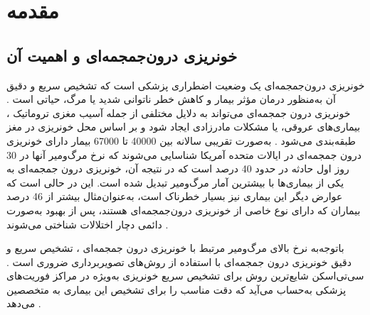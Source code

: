 \setcounter{chapter}{0}	
\chapter{مقدمه}

\section{ خونریزی درون‌جمجمه‌ای و اهمیت آن}

خونریزی‌ درون‌جمجمه‌ای
یک وضعیت اضطراری پزشکی است که تشخیص سریع و دقیق آن به‌منظور درمان مؤثر بیمار و کاهش خطر ناتوانی شدید یا مرگ، حیاتی است \cite{grewal2018radnet}.
خونریزی درون جمجمه‌ای
می‌تواند به دلایل مختلفی از جمله آسیب مغزی تروماتیک
، بیماری‌های عروقی، یا مشکلات مادرزادی ایجاد شود و بر اساس محل خونریزی در مغز طبقه‌بندی می‌شود \cite{monica2022detection}.
 به‌صورت تقریبی سالانه بین 40000 تا 67000 بیمار دارای
خونریزی درون جمجمه‌ای
   در ایالات متحده آمریکا شناسایی می‌شوند که نرخ مرگ‌ومیر آنها در 30 روز اول حادثه در حدود 40 درصد است که در نتیجه آن، 
خونریزی درون جمجمه‌ای
   به یکی از بیماری‌ها با بیشترین آمار مرگ‌ومیر تبدیل شده است. این در حالی است که عوارض دیگر این بیماری نیز بسیار خطرناک است، به‌عنوان‌مثال بیشتر از 46 درصد بیماران که دارای نوع خاصی از خونریزی درون‌جمجمه‌ای هستند، پس از بهبود به‌صورت دائمی دچار اختلالات شناختی می‌شوند
 \cite{arbabshirani2018advanced,burduja2020accurate,morgenstern2010guidelines,van2010incidence,hackett2000health}.

  باتوجه‌به نرخ بالای مرگ‌ومیر مرتبط با 
  خونریزی درون جمجمه‌ای
  ، تشخیص سریع و دقیق 
  خونریزی درون جمجمه‌ای
  با استفاده از روش‌های تصویربرداری ضروری است \cite{kuo2019expert}. سی‌تی‌اسکن
   شایع‌ترین روش برای تشخیص سریع خونریزی به‌ویژه در مراکز فوریت‌های پزشکی به‌حساب می‌آید که دقت مناسب را برای تشخیص این بیماری به متخصصین می‌دهد \cite{ye2019precise,grewal2018radnet,arbabshirani2018advanced,chilamkurthy2018deep}.


